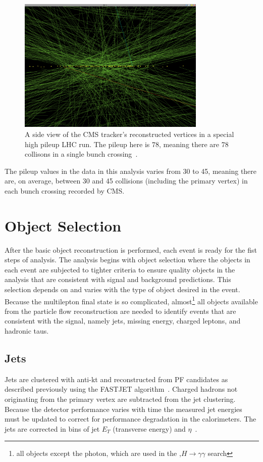 \begin{figure}[hbtp]
 \begin{center}
   \includegraphics[width=0.8\textwidth]{ch4_figs/cms_pileup.pdf}
   \caption[Pileup vertices in the CMS tracker]{A side view of the CMS tracker's reconstructed vertices in a special high pileup LHC run. The pileup here is 78, meaning there are
78 collisons in a single bunch crossing~\cite{pileup_image}.}
   \label{fig:pileup_vertices}
 \end{center}
\end{figure}

\noindent The pileup values in the data in this analysis varies from 30 to 45, meaning there are, on average, between 30 and 45 collisions (including the primary vertex) in each
bunch crossing recorded by CMS. 

\section{Object Selection}
After the basic object reconstruction is performed, each event is ready for the fist steps of analysis. The analysis begins with object selection where the objects in each
event are subjected to tighter criteria to ensure quality objects in the analysis that are consistent with signal and background predictions. This selection depends on and 
varies with the type of object desired in the event. Because the \tth multilepton final state is so complicated, almost\footnote{all objects except the photon, which are
used in the \tth,$H\rightarrow\gamma\gamma$ search} all objects available from the particle flow
reconstruction are needed to identify events that are consistent with the signal, namely jets, missing energy, charged leptons, and hadronic taus.

\subsection{Jets}
Jets are clustered with anti-kt and reconstructed from PF candidates as described previously using the FASTJET algorithm~\cite{antikt}\cite{fastjet}.
Charged hadrons not originating from the primary vertex are subtracted from the jet clustering. Because the detector performance varies with time the measured jet energies
must be updated to correct for performance degradation in the calorimeters. The jets are corrected in bins of jet $E_{T}$ (transverse energy) and $\eta$~\cite{jec}.

